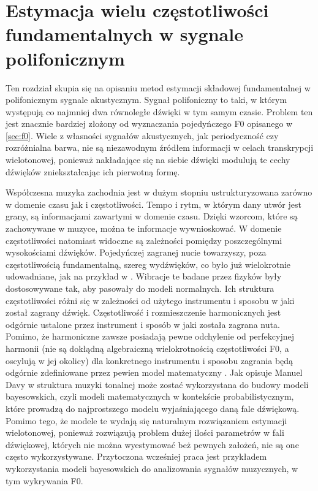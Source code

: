 \documentclass[12pt,a4paper,twoside]{mwart}
\begin{document}
\newpage
\section{Estymacja wielu częstotliwości fundamentalnych w sygnale polifonicznym}\label{sec:MultiPitch}
Ten rozdział skupia się na opisaniu metod estymacji składowej fundamentalnej w polifonicznym sygnale akustycznym. Sygnał polifoniczny to taki, w którym występują co najmniej dwa równoległe dźwięki w tym samym czasie. Problem ten jest znacznie bardziej złożony od wyznaczania pojedyńczego F0 opisanego w \ref{sec:f0}. Wiele z własności sygnałów akustycznych, jak periodyczność czy rozróżnialna barwa, nie są niezawodnym źródłem informacji w celach transkrypcji wielotonowej, ponieważ nakładające się na siebie dźwięki modulują te cechy dźwięków zniekształcając ich pierwotną formę.

Współczesna muzyka zachodnia jest w dużym stopniu ustrukturyzowana zarówno w domenie czasu jak i częstotliwości. Tempo i rytm, w którym dany utwór jest grany, są informacjami zawartymi w domenie czasu. Dzięki wzorcom, które są zachowywane w muzyce, można te informacje wywnioskować. W domenie częstotliwości natomiast widoczne są zależności pomiędzy poszczególnymi wysokościami dźwięków. Pojedyńczej zagranej nucie towarzyszy, poza częstotliwością fundamentalną, szereg wydźwięków, co było już wielokrotnie udowadniane, jak na przykład w \cite[1325-1326]{Transcription:Mcintyre:OnTheOscilation}. Wibracje te badane przez fizyków były dostosowywane tak, aby pasowały do modeli normalnych. Ich struktura częstotliwości różni się w zależności od użytego instrumentu i sposobu w jaki został zagrany dźwięk. Częstotliwość i rozmieszczenie harmonicznych jest odgórnie ustalone przez instrument i sposób w jaki została zagrana nuta. Pomimo, że harmoniczne zawsze posiadają pewne odchylenie od perfekcyjnej harmonii (nie są dokłądną algebraiczną wielokrotnością częstotliwości F0, a oscylują w jej okolicy) dla konkretnego instrumentu i sposobu zagrania będą odgórnie zdefiniowane przez pewien model matematyczny \cite[1326-1327]{Transcription:Mcintyre:OnTheOscilation}. Jak opisuje Manuel Davy w \cite[203-204]{Transcription:Anssi:SignalProcessingMethods} struktura muzyki tonalnej może zostać wykorzystana do budowy modeli bayesowskich, czyli modeli matematycznych w kontekście probabilistycznym, które prowadzą do najprostszego modelu wyjaśniającego daną fale dźwiękową. Pomimo tego, że modele te wydają się naturalnym rozwiązaniem estymacji wielotonowej, ponieważ rozwiązują problem dużej ilości parametrów w fali dźwiękowej, których nie można wyestymować beż pewnych założeń, nie są one często wykorzystywane. Przytoczona wcześniej praca \cite{Transcription:BayesianHarmonicModels} jest przykładem wykorzystania modeli bayesowskich do analizowania sygnałów muzycznych, w tym wykrywania F0.
\end{document}
